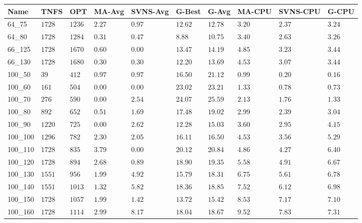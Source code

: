 \begin{center}
\begin{table}[]
\centering
\begin{tabular}{|lll|l|l|ll|lll|}
\hline
Name    & TNFS     & OPT    & MA-Avg & SVNS-Avg & G-Best & G-Avg & MA-CPU & SVNS-CPU & G-CPU \\
\hline
64\_75  & $1728   $& $1236$ & $2.27$ & $0.97$   & $12.62$    & $12.78$   & $3.20 $& $2.37$   & $3.24$ \\
64\_80  & $1728   $& $1284$ & $0.31$ & $0.47$   & $8.88$    & $10.75$   & $3.40 $& $2.63$   & $3.26$ \\
\hline
66\_125 & $1728   $& $1670$ & $0.60$ & $\bm{0.00}$   & $13.47$    & $14.19$   & $4.85 $& $3.23$   & $3.44$ \\
66\_130 & $1728   $& $1680$ & $0.30$ & $0.30$   & $12.20$    & $13.69$   & $4.53 $& $3.07$   & $3.44$ \\
\hline
100\_50 & $39     $& $412 $ & $0.97$ & $0.97$   & $16.50$    & $21.12$   & $0.99 $& $0.20$   & $0.16$ \\
100\_60 & $161    $& $504 $ & $\bm{0.00}$ & $\bm{0.00}$   & $23.02$    & $23.21$   & $1.33 $& $0.78$   & $0.73$ \\
100\_70 & $276    $& $590 $ & $\bm{0.00}$ & $2.54$   & $24.07$    & $25.59$   & $2.13 $& $1.76$   & $1.33$ \\
100\_80 & $892    $& $652 $ & $0.51$ & $1.69$   & $17.48$    & $19.02$   & $2.99 $& $2.39$   & $3.04$ \\
100\_90 & $1220   $& $725 $ & $\bm{0.00}$ & $2.62$   & $12.28$    & $15.03$   & $3.60 $& $2.95$   & $4.15$ \\
100\_100& $1296   $& $782 $ & $2.30$ & $2.05$   & $16.11$    & $16.50$   & $4.53 $& $3.56$   & $5.29$ \\
100\_110& $1728   $& $835 $ & $3.79$ & $\bm{0.00}$   & $20.12$    & $20.84$   & $4.86 $& $4.27$   & $6.40$ \\
100\_120& $1728   $& $894 $ & $2.68$ & $0.89$   & $18.90$    & $19.35$   & $5.58 $& $4.91$   & $6.67$ \\
100\_130& $1551   $& $956 $ & $1.99$ & $4.92$   & $15.79$    & $18.31$   & $6.75 $& $5.61$   & $6.78$ \\
100\_140& $1551   $& $1013$ & $1.32$ & $5.82$   & $18.36$    & $18.85$   & $7.52 $& $6.12$   & $6.98$ \\
100\_150& $1728   $& $1057$ & $1.99$ & $1.42$   & $13.72$    & $15.42$   & $8.53 $& $7.17$   & $7.10$ \\
100\_160& $1728   $& $1114$ & $2.99$ & $8.17$   & $18.04$    & $18.67$   & $9.52 $& $7.83$   & $7.31$ \\

\end{tabular}
\end{table}
\end{center}
